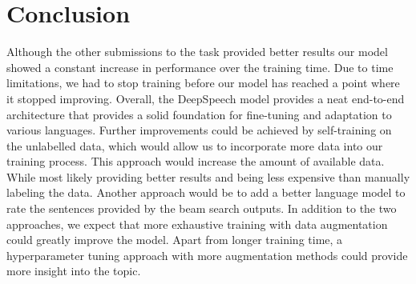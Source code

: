 \section{Conclusion}
Although the other submissions to the task provided better results our model showed a constant increase in performance over the training time. Due to time limitations, we had to stop training before
our model has reached a point where it stopped improving. Overall, the DeepSpeech model provides a neat end-to-end architecture that provides a solid foundation for fine-tuning and adaptation to various
languages. Further improvements could be achieved by self-training on the unlabelled data, which would allow us to incorporate more data into our training process. This approach would increase the
amount of available data. While most likely providing better results and being less expensive than manually labeling the data. Another approach would be to add a better language model to rate the
sentences provided by the beam search outputs. In addition to the two approaches, we expect that more exhaustive training with data augmentation could greatly improve the model. Apart from longer
training time, a hyperparameter tuning approach with more augmentation methods could provide more insight into the topic.
